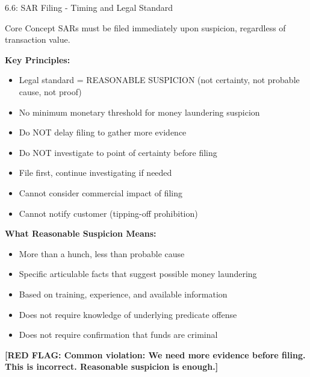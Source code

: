 \documentclass[11pt,a4paper]{beamer}
\newcommand{\redflag}[1]{\textcolor{red!80!black}{\textbf{[RED FLAG: #1]}}}
\begin{document}
\begin{frame}{6.6: SAR Filing - Timing and Legal Standard}
	\begin{block}{Core Concept}
		SARs must be filed immediately upon suspicion, regardless of transaction value.
	\end{block}
	\textbf{Key Principles:}
	\begin{itemize}
		\item Legal standard = REASONABLE SUSPICION (not certainty, not probable cause, not proof)
		\item No minimum monetary threshold for money laundering suspicion
		\item Do NOT delay filing to gather more evidence
		\item Do NOT investigate to point of certainty before filing
		\item File first, continue investigating if needed
		\item Cannot consider commercial impact of filing
		\item Cannot notify customer (tipping-off prohibition)
	\end{itemize}
	\textbf{What Reasonable Suspicion Means:}
	\begin{itemize}
		\item More than a hunch, less than probable cause
		\item Specific articulable facts that suggest possible money laundering
		\item Based on training, experience, and available information
		\item Does not require knowledge of underlying predicate offense
		\item Does not require confirmation that funds are criminal
	\end{itemize}
	\redflag{Common violation: We need more evidence before filing. This is incorrect. Reasonable suspicion is enough.}
\end{frame}
\end{document}
